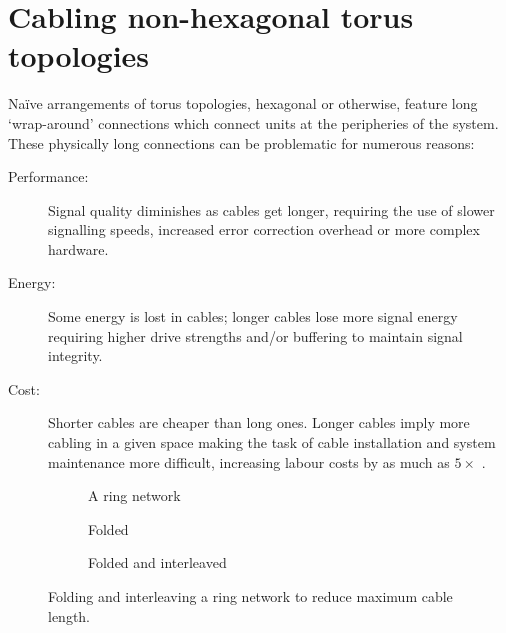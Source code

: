 	\section{Cabling non-hexagonal torus topologies}
		
		Na\"ive arrangements of torus topologies, hexagonal or otherwise, feature
		long `wrap-around' connections which connect units at the peripheries of
		the system. These physically long connections can be problematic for
		numerous reasons:
		
		\begin{description}
			
			\item[Performance:] Signal quality diminishes as cables get longer,
			requiring the use of slower signalling speeds, increased error
			correction overhead or more complex hardware.
			
			\item[Energy:] Some energy is lost in cables; longer cables lose more
			signal energy requiring higher drive strengths and/or buffering to
			maintain signal integrity.
			
			\item[Cost:] Shorter cables are cheaper than long ones.  Longer cables
			imply more cabling in a given space making the task of cable installation
			and system maintenance more difficult, increasing labour costs by as much
			as $5\times$ \cite{curtis12}.
			
		\end{description}
		
		\begin{figure}
			\center
			\begin{subfigure}[b]{0.39\linewidth}
				\center
				\caption{A ring network}
				\label{fig:ring-folding-row}
			\end{subfigure}
			\begin{subfigure}[b]{0.24\linewidth}
				\center
				\caption{Folded}
				\label{fig:ring-folding-folded}
			\end{subfigure}
			\begin{subfigure}[b]{0.35\linewidth}
				\center
				\caption{Folded and interleaved}
				\label{fig:ring-folding-interleaved}
			\end{subfigure}
			
			\caption{Folding and interleaving a ring network to reduce maximum cable
			length.}
			\label{fig:ring-folding}
		\end{figure}
		

